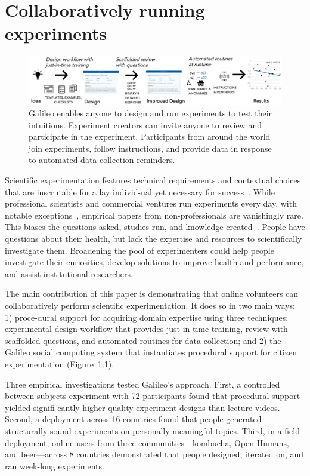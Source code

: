 
\chapter{Collaboratively running experiments}
\begin{figure}[h] 
  \centering
  \includegraphics[width=1.0\textwidth]{figures/galileo/galileo-1}
  \caption[]
{Galileo enables anyone to design and run experiments to test their intuitions. Experiment creators can invite anyone to review and participate in the experiment. Participants from around the world join experiments, follow instructions, and provide data in response to automated data collection reminders.}
  \label{fig:galileo-1}
\end{figure}

Scientific experimentation features technical requirements and contextual choices that are inscrutable for a lay individ-ual yet necessary for success~\cite{Martin2007}. While professional scientists and commercial ventures run experiments every day, with notable exceptions~\cite{Cooper2010, Lewis2016}, empirical papers from non-professionals are vanishingly rare. This biases the questions asked, studies run, and knowledge created~\cite{crawford2017politics,Henrich2010a}. People have questions about their health, but lack the expertise and resources to scientifically investigate them. Broadening the pool of experimenters could help people investigate their curiosities, develop solutions to improve health and performance, and assist institutional researchers.

The main contribution of this paper is demonstrating that online volunteers can collaboratively perform scientific experimentation. It does so in two main ways: 1) proce-dural support for acquiring domain expertise using three techniques: experimental design workflow that provides just-in-time training, review with scaffolded questions, and automated routines for data collection; and 2) the Galileo social computing system that instantiates procedural support for citizen experimentation (Figure~\ref{fig:galileo-1}). 

Three empirical investigations tested Galileo’s approach. First, a controlled between-subjects experiment with 72 participants found that procedural support yielded signifi-cantly higher-quality experiment designs than lecture videos. Second, a deployment across 16 countries found that people generated structurally-sound experiments on personally meaningful topics. Third, in a field deployment, online users from three communities—kombucha, Open Humans, and beer—across 8 countries demonstrated that people designed, iterated on, and ran week-long experiments.

